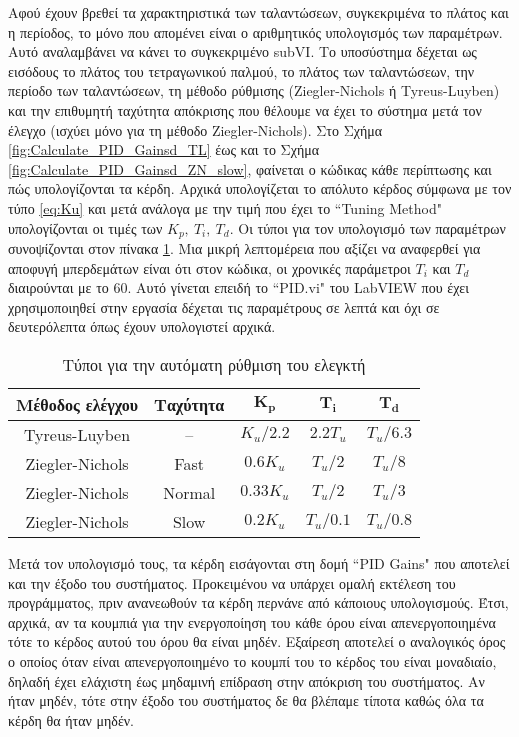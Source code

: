 Αφού έχουν βρεθεί τα χαρακτηριστικά των ταλαντώσεων, συγκεκριμένα το πλάτος και η περίοδος, το μόνο που απομένει είναι ο αριθμητικός υπολογισμός των παραμέτρων. Αυτό αναλαμβάνει να κάνει το συγκεκριμένο subVI. Το υποσύστημα δέχεται ως εισόδους το πλάτος του τετραγωνικού παλμού, το πλάτος των ταλαντώσεων, την περίοδο των ταλαντώσεων, τη μέθοδο ρύθμισης (Ziegler-Nichols ή Tyreus-Luyben) και την επιθυμητή ταχύτητα απόκρισης που θέλουμε να έχει το σύστημα μετά τον έλεγχο (ισχύει μόνο για τη μέθοδο Ziegler-Nichols). Στο Σχήμα \ref{fig:Calculate_PID_Gainsd_TL} έως και το Σχήμα \ref{fig:Calculate_PID_Gainsd_ZN_slow}, φαίνεται ο κώδικας κάθε περίπτωσης και πώς υπολογίζονται τα κέρδη. Αρχικά υπολογίζεται το απόλυτο κέρδος σύμφωνα με τον τύπο \ref{eq:Ku} και μετά ανάλογα με την τιμή που έχει το ``Tuning Method" υπολογίζονται οι τιμές των $K_p,\ T_i,\ T_d$. Οι τύποι για τον υπολογισμό των παραμέτρων συνοψίζονται στον πίνακα \ref{table:autotuning_parameters}. Μια μικρή λεπτομέρεια που αξίζει να αναφερθεί για αποφυγή μπερδεμάτων είναι ότι στον κώδικα, οι χρονικές παράμετροι $T_i$ και $T_d$ διαιρούνται με το $60$. Αυτό γίνεται επειδή το ``PID.vi" του LabVIEW που έχει χρησιμοποιηθεί στην εργασία δέχεται τις παραμέτρους σε λεπτά και όχι σε δευτερόλεπτα όπως έχουν υπολογιστεί αρχικά. 

\begin{table}[h]
\begin{center}
	\begin{tabular}{|c|c|c|c|c|}
	\hline 
	\textbf{Μέθοδος ελέγχου} & \textbf{Ταχύτητα} & $\mathbf{K_p}$ & $\mathbf{T_i}$ & $\mathbf{T_d}$ \\ 
	\hline 
	Tyreus-Luyben & -- & $K_u/2.2$ & $2.2T_u$ & $T_u/6.3$ \\ 
	\hline
	Ziegler-Nichols & Fast & $0.6K_u$ & $T_u/2$ & $T_u/8$ \\
	\hline
	Ziegler-Nichols & Normal & $0.33K_u$ & $T_u/2$ & $T_u/3$ \\
	\hline
	Ziegler-Nichols & Slow & $0.2K_u$ & $T_u/0.1$ & $T_u/0.8$ \\
	\hline
	\end{tabular} 
\caption{Τύποι για την αυτόματη ρύθμιση του ελεγκτή}
\label{table:autotuning_parameters}
\end{center}
\end{table}

Μετά τον υπολογισμό τους, τα κέρδη εισάγονται στη δομή ``PID Gains" που αποτελεί και την έξοδο του συστήματος. Προκειμένου να υπάρχει ομαλή εκτέλεση του προγράμματος, πριν ανανεωθούν τα κέρδη περνάνε από κάποιους υπολογισμούς. Έτσι, αρχικά, αν τα κουμπιά για την ενεργοποίηση του κάθε όρου είναι απενεργοποιημένα τότε το κέρδος αυτού του όρου θα είναι μηδέν. Εξαίρεση αποτελεί ο αναλογικός όρος ο οποίος όταν είναι απενεργοποιημένο το κουμπί του το κέρδος του είναι μοναδιαίο, δηλαδή έχει ελάχιστη έως μηδαμινή επίδραση στην απόκριση του συστήματος. Αν ήταν μηδέν, τότε στην έξοδο του συστήματος δε θα βλέπαμε τίποτα καθώς όλα τα κέρδη θα ήταν μηδέν.

